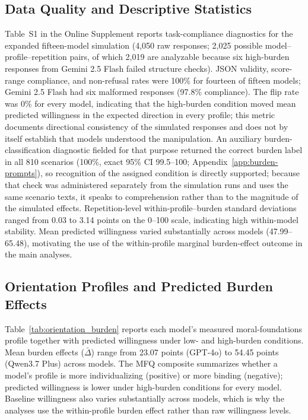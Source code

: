 \documentclass[12pt,a4paper]{article}
\begin{document}
\subsection{Data Quality and Descriptive Statistics}
\label{sec:results-data-quality}

Table~S1 in the Online Supplement reports task-compliance diagnostics for the expanded fifteen-model simulation (4,050 raw responses; 2,025 possible model--profile--repetition pairs, of which 2,019 are analyzable because six high-burden responses from Gemini 2.5 Flash failed structure checks). JSON validity, score-range compliance, and non-refusal rates were 100\% for fourteen of fifteen models; Gemini 2.5 Flash had six malformed responses (97.8\% compliance). The flip rate was 0\% for every model, indicating that the high-burden condition moved mean predicted willingness in the expected direction in every profile; this metric documents directional consistency of the simulated responses and does not by itself establish that models understood the manipulation. An auxiliary burden-classification diagnostic fielded for that purpose returned the correct burden label in all 810 scenarios (100\%, exact 95\% CI 99.5--100; Appendix~\ref{app:burden-prompts}), so recognition of the assigned condition is directly supported; because that check was administered separately from the simulation runs and uses the same scenario texts, it speaks to comprehension rather than to the magnitude of the simulated effects. Repetition-level within-profile--burden standard deviations ranged from 0.03 to 3.14 points on the 0--100 scale, indicating high within-model stability. Mean predicted willingness varied substantially across models (47.99--65.48), motivating the use of the within-profile marginal burden-effect outcome in the main analyses.

\subsection{Orientation Profiles and Predicted Burden Effects}
\label{sec:results-orientation-burden}

Table~\ref{tab:orientation_burden} reports each model's measured moral-foundations profile together with predicted willingness under low- and high-burden conditions. Mean burden effects ($\bar{\Delta}$) range from 23.07 points (GPT-4o) to 54.45 points (Qwen3.7 Plus) across models. The MFQ composite summarizes whether a model's profile is more individualizing (positive) or more binding (negative); predicted willingness is lower under high-burden conditions for every model. Baseline willingness also varies substantially across models, which is why the analyses use the within-profile burden effect rather than raw willingness levels.
\end{document}
